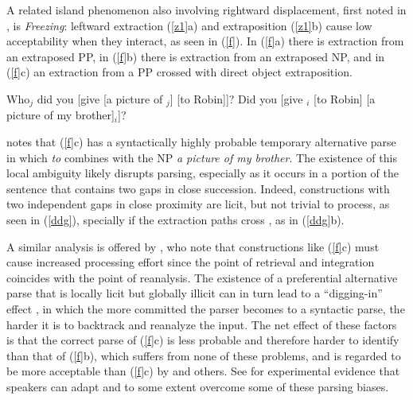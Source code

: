 \documentclass[output=paper
                ,modfonts
                ,nonflat
	        ,collection
	        ,collectionchapter
	        ,collectiontoclongg
 	        ,biblatex
                ,babelshorthands
                ,newtxmath
                ,draftmode
                ,colorlinks, citecolor=brown
]{./langsci/langscibook}
\begin{document}
A related island phenomenon also involving rightward displacement, first noted in \citet[305]{Ross67},
is \emph{Freezing}: leftward extraction (\ref{z1}a) and extraposition (\ref{z1}b) cause low acceptability when they interact, as seen in (\ref{f}). In (\ref{f}a) there is extraction from an extraposed PP,  in (\ref{f}b)  there is extraction from an extraposed NP,  and  in (\ref{f}c) an extraction from a PP crossed with direct object extraposition. 
 
 
\eal \label{z1}
\ex Who$_j$ did you [give [a picture of \spc$_j$] [to Robin]]?
\ex Did you [give \spc$_i$ [to Robin] [a picture of my brother]$_i$]?
\zl

\eal \label{f}
\zl


  \citet[457]{fodor78} notes that (\ref{f}c) has a syntactically highly probable temporary alternative parse  in which \emph{to} combines with the NP \emph{a picture of my brother}. The existence of this local ambiguity  likely disrupts  parsing, especially as it occurs in a portion of the sentence that contains two gaps in close succession. Indeed, constructions with two independent gaps in close proximity  are licit, but not trivial to process, as seen in (\ref{ddg}), specially if the  extraction paths cross  \citep{fodor78}, as in (\ref{ddg}b).

\eal \label{ddg}
\zl

\noindent
A similar analysis is offered by \citet[477]{freezing}, who note that  constructions like (\ref{f}c) must cause increased processing effort since the point of retrieval and integration coincides with the point of reanalysis. The existence of a preferential alternative parse that is locally licit but globally illicit  can in turn lead to a  ``digging-in'' effect \citep{ferreirahend,ferreirahend2,tabor3}, in which the  more committed the parser  becomes to a syntactic parse, the  harder it is to backtrack and reanalyze the  input. The net effect of these factors is that the correct parse of
(\ref{f}c) is less probable and therefore harder to identify than that of  (\ref{f}b), which suffers from none of  these problems, and is  regarded to be more acceptable than
 (\ref{f}c) by \citet[453]{fodor78} and others. See \citet{chavesf} for experimental evidence that speakers
 can adapt and to some extent overcome some of these parsing biases.
 
\end{document}
